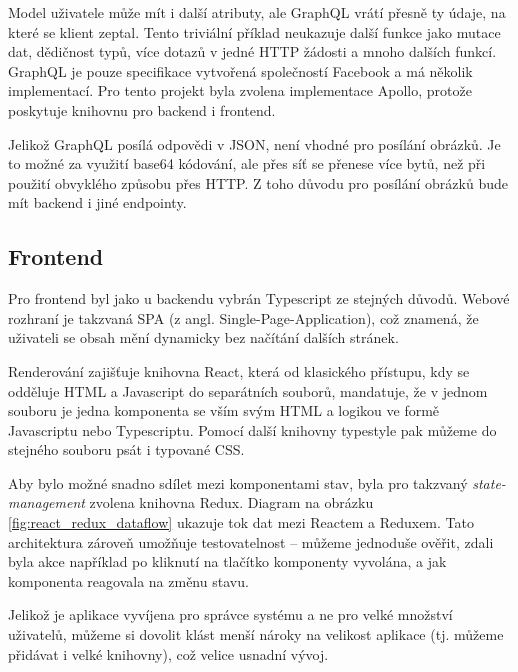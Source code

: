Model uživatele může mít i další atributy, ale GraphQL vrátí přesně ty údaje, na které se klient zeptal.
Tento triviální příklad neukazuje další funkce jako mutace dat, dědičnost typů, více dotazů v jedné HTTP žádosti
a mnoho dalších funkcí.
GraphQL je pouze specifikace vytvořená společností Facebook a má několik
implementací. \citep[][]{GraphQLDoc} Pro tento projekt byla zvolena implementace Apollo,
protože poskytuje knihovnu pro backend i frontend. \citep[][]{Apollo}

Jelikož GraphQL posílá odpovědi v JSON, není vhodné pro posílání obrázků. Je to možné za využití base64 kódování,
ale přes síť se přenese více bytů, než při použití obvyklého způsobu přes HTTP. Z toho důvodu pro posílání
obrázků bude mít backend i jiné endpointy.

\subsection{Frontend} \label{frontend}

\noindent
Pro frontend byl jako u backendu vybrán Typescript ze stejných důvodů. Webové rozhraní
je takzvaná SPA (z angl. Single-Page-Application), což znamená, že uživateli se obsah mění dynamicky
bez načítání dalších stránek.

Renderování zajišťuje knihovna React, která od klasického přístupu, kdy se odděluje HTML a Javascript do separátních
souborů, mandatuje, že v jednom souboru je jedna komponenta se vším svým HTML a logikou ve formě Javascriptu nebo
Typescriptu. \citep[][]{Reactjs}
Pomocí další knihovny typestyle pak můžeme do stejného souboru psát i typované CSS.\citep[][]{typestyle}

Aby bylo možné snadno sdílet mezi komponentami stav, byla pro takzvaný \textit{state-management} zvolena knihovna Redux.
\citep[][]{ReduxCore}
Diagram na obrázku \ref{fig:react_redux_dataflow} ukazuje tok dat mezi Reactem a Reduxem.
Tato architektura zároveň umožňuje testovatelnost -- můžeme jednoduše ověřit, zdali byla akce
například po kliknutí na tlačítko komponenty vyvolána, a jak komponenta reagovala na změnu stavu.

Jelikož je aplikace vyvíjena pro správce systému a ne pro velké množství uživatelů, můžeme si dovolit
klást menší nároky na velikost aplikace (tj. můžeme přidávat i velké knihovny), což velice usnadní vývoj.

